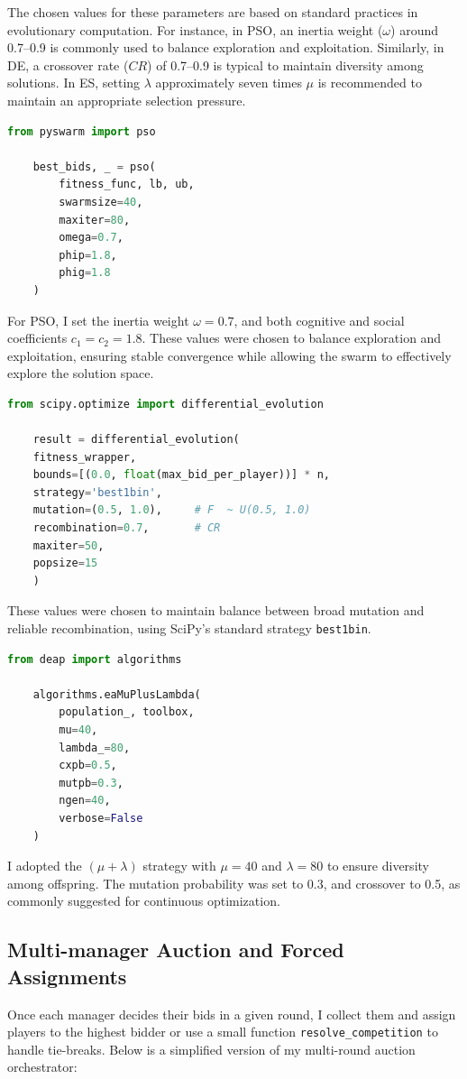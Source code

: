 \documentclass[sigconf]{acmart}
\begin{document}
The chosen values for these parameters are based on standard practices in evolutionary computation. For instance, in PSO, an inertia weight ($\omega$) around 0.7–0.9 is commonly used to balance exploration and exploitation. Similarly, in DE, a crossover rate ($CR$) of 0.7–0.9 is typical to maintain diversity among solutions. In ES, setting $\lambda$ approximately seven times $\mu$ is recommended to maintain an appropriate selection pressure.

\begin{lstlisting}[language=Python, caption=PSO parameter setup with pyswarm]
	from pyswarm import pso
	
	best_bids, _ = pso(
		fitness_func, lb, ub,
		swarmsize=40,
		maxiter=80,
		omega=0.7,
		phip=1.8,
		phig=1.8
	)
\end{lstlisting}

For PSO, I set the inertia weight $\omega = 0.7$, and both cognitive and social coefficients $c_1 = c_2 = 1.8$. These values were chosen to balance exploration and exploitation, ensuring stable convergence while allowing the swarm to effectively explore the solution space.


\begin{lstlisting}[language=Python, caption=DE parameter setup with SciPy]
	from scipy.optimize import differential_evolution
	
	result = differential_evolution(
	fitness_wrapper,
	bounds=[(0.0, float(max_bid_per_player))] * n,
	strategy='best1bin',
	mutation=(0.5, 1.0),     # F  ~ U(0.5, 1.0)
	recombination=0.7,       # CR
	maxiter=50,
	popsize=15
	)
\end{lstlisting}


These values were chosen to maintain balance between broad mutation and reliable recombination, using SciPy’s standard strategy \texttt{best1bin}.


\begin{lstlisting}[language=Python, caption=ES setup with DEAP using ($\mu$$+$$\lambda$)]
	from deap import algorithms
	
	algorithms.eaMuPlusLambda(
		population_, toolbox,
		mu=40,
		lambda_=80,
		cxpb=0.5,
		mutpb=0.3,
		ngen=40,
		verbose=False
	)
\end{lstlisting}
I adopted the $(\mu + \lambda)$ strategy with $\mu=40$ and $\lambda=80$ to ensure diversity among offspring. The mutation probability was set to 0.3, and crossover to 0.5, as commonly suggested for continuous optimization.

	
	\subsection{Multi-manager Auction and Forced Assignments}
	Once each manager decides their bids in a given round, I collect them and assign players to the highest bidder or use a small function \texttt{resolve\_competition} to handle tie-breaks. Below is a simplified version of my multi-round auction orchestrator:
	
\end{document}
